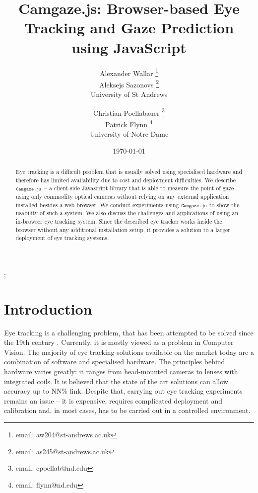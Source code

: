\documentclass[annual]{acmsiggraph}
\title{Camgaze.js: Browser-based Eye Tracking and Gaze Prediction using
JavaScript}
\author{Alexander Wallar \thanks{email: aw204@st-andrews.ac.uk} \\ Aleksejs
Sazonovs \thanks{email: as245@st-andrews.ac.uk} \\ University of St Andrews
\and Christian Poellabauer \thanks{email: cpoellab@nd.edu} \\ Patrick Flynn
\thanks{email: flynn@nd.edu} \\ University of Notre Dame}
\date{\today}
\newcommand{\Acronym}[1]{\ensuremath{{\small{\texttt{#1}}}}}
\newcommand{\Name}{\Acronym{Camgaze.js}} \newcommand{\False}{\Constant{false}}
\newcommand{\Constant}[1]{\ensuremath{\small{\texttt{#1}}}}
\begin{document}
\maketitle

\begin{abstract}

Eye tracking is a difficult problem that is usually solved using specialised
hardware and therefore has limited availability due to cost and deployment
difficulties. We describe $\Name$ – a client-side Javascript library that is
able to measure the point of gaze using only commodity optical cameras without
relying on any external application installed besides a web-browser. We conduct
experiments using $\Name$ to show the usability of such a system.  We also
discuss the challenges and applications of using an in-browser eye tracking
system. Since the described eye tracker works inside the browser without any
additional installation setup, it provides a solution to a larger deployment of
eye tracking systems.

\end{abstract}

\begin{CRcatlist} ;

\end{CRcatlist}

\keywordlist


\copyrightspace

\section{Introduction}

Eye tracking is a challenging problem, that has been attempted to be solved
since the 19th century \cite{Ahrens1891}. Currently, it is mostly viewed as a
problem in Computer Vision. The majority of eye tracking solutions available on
the market today are a combination of software and specialised hardware. The
principles behind hardware varies greatly: it ranges from head-mounted cameras
to lenses with integrated coils. It is believed that the state of the art
solutions can allow accuracy up to NN\% {link}. Despite that, carrying out eye
tracking experiments remains an issue – it is expensive, requires complicated
deployment and calibration and, in most cases, has to be carried out in a
controlled environment.
\end{document}
